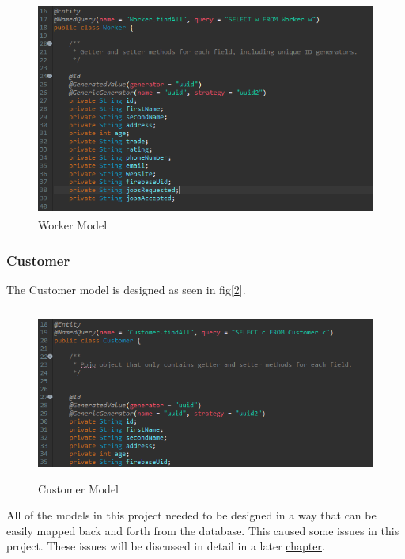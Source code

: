 \begin{figure}[H]
    \centering
    \includegraphics[width=\textwidth, height=200pt]{DesignImages/WorkerModel.PNG}
    \caption{Worker Model}
    \label{fig:workerModel}
\end{figure}



\subsubsection{Customer}
\label{sec:SystemDesignCustomer}

The Customer model is designed as seen in fig[\ref{fig:customerModel}].

\begin{figure}[H]
    \centering
    \includegraphics[width=\textwidth, height=160pt]{DesignImages/CustomerModel.PNG}
    \caption{Customer Model}
    \label{fig:customerModel}
\end{figure}

\bigskip

All of the models in this project needed to be designed in a way that can be easily mapped back and forth from the database. This caused some issues in this project. These issues will be discussed in detail in a later \hyperref[sec:SystemEvaluationObjectMapping]{\underline{chapter}}.



